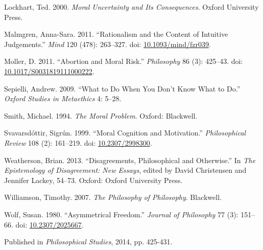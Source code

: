 \documentclass[
  10pt,
  letterpaper,
  DIV=11,
  numbers=noendperiod,
  twoside]{scrartcl}
\newlength{\cslhangindent}
\newenvironment{CSLReferences}[2] %
 {\begin{list}{}{%
  \setlength{\itemindent}{0pt}
  \setlength{\leftmargin}{0pt}
  \setlength{\parsep}{0pt}
  \ifodd #1
   \setlength{\leftmargin}{\cslhangindent}
   \setlength{\itemindent}{-1\cslhangindent}
  \fi
  \setlength{\itemsep}{#2\baselineskip}}}
 {\end{list}}
\begin{document}
\begin{CSLReferences}{1}{0}
Lockhart, Ted. 2000. \emph{Moral Uncertainty and Its Consequences}.
Oxford University Press.

Malmgren, Anna-Sara. 2011. {``Rationalism and the Content of Intuitive
Judgements.''} \emph{Mind} 120 (478): 263--327. doi:
\href{https://doi.org/10.1093/mind/fzr039}{10.1093/mind/fzr039}.

Moller, D. 2011. {``Abortion and Moral Risk.''} \emph{Philosophy} 86
(3): 425--43. doi:
\href{https://doi.org/10.1017/S0031819111000222}{10.1017/S0031819111000222}.

Sepielli, Andrew. 2009. {``What to Do When You Don't Know What to Do.''}
\emph{Oxford Studies in Metaethics} 4: 5--28.

Smith, Michael. 1994. \emph{The Moral Problem}. Oxford: Blackwell.

Svavarsdóttir, Sigrún. 1999. {``Moral Cognition and Motivation.''}
\emph{Philosophical Review} 108 (2): 161--219. doi:
\href{https://doi.org/10.2307/2998300}{10.2307/2998300}.

Weatherson, Brian. 2013. {``Disagreements, Philosophical and
Otherwise.''} In \emph{The Epistemology of Disagreement: New Essays},
edited by David Christensen and Jennifer Lackey, 54--73. Oxford: Oxford
University Press.

Williamson, Timothy. 2007. \emph{{The Philosophy of Philosophy}}.
Blackwell.

Wolf, Susan. 1980. {``Asymmetrical Freedom.''} \emph{Journal of
Philosophy} 77 (3): 151--66. doi:
\href{https://doi.org/10.2307/2025667}{10.2307/2025667}.

\end{CSLReferences}



\noindent Published in\emph{
Philosophical Studies}, 2014, pp. 425-431.
\end{document}
